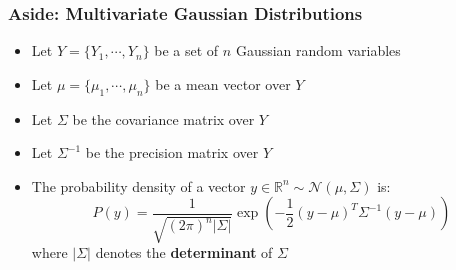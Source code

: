 \documentclass[10pt]{article}
\begin{document}
\subsubsection*{Aside: Multivariate Gaussian Distributions}
\begin{itemize}
	\item Let $Y = \{Y_1, \cdots, Y_n\}$ be a set of $n$ Gaussian random variables
	\item Let $\mu = \{\mu_1, \cdots, \mu_n\}$ be a mean vector over $Y$
	\item Let $\Sigma$ be the covariance matrix over $Y$
	\item Let $\Sigma^{-1}$ be the precision matrix over $Y$
	\item The probability density of a vector $y \in \mathbb{R}^n \sim \mathcal{N}(\mu, \Sigma)$ is:
	\[P(y) = \frac{1}{\sqrt{(2\pi)^n |\Sigma|}} \exp \left(-\frac{1}{2} (y - \mu)^T \Sigma^{-1} (y - \mu)\right)\]
    where $|\Sigma|$ denotes the \textbf{determinant} of $\Sigma$
\end{itemize}
\end{document}
